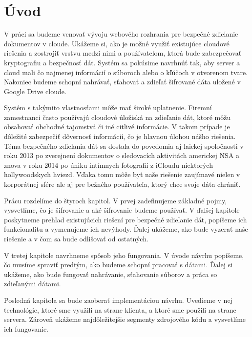 \chapter*{Úvod}

V práci sa budeme venovať vývoju webového rozhrania pre bezpečné zdieľanie dokumentov  v cloude.
Ukážeme si, ako je možné využiť existujúce cloudové riešenia a zostrojiť vrstvu medzi nimi a používateľom, ktorá
bude zabezpečovať kryptografiu a bezpečnosť dát. Systém sa pokúsime navrhnúť tak, aby server a cloud mali čo najmenej 
 informácií o súboroch alebo o kľúčoch v otvorenom tvare.
Nakoniec budeme schopní nahrávať, sťahovať a zdieľať šifrované dáta uložené v Google Drive cloude.

Systém s takýmito vlastnosťami môže mať široké uplatnenie. Firemní zamestnanci často používajú cloudové úložiská na zdieľanie dát, ktoré 
môžu obsahovať obchodné tajomstvá či iné citlivé informácie. V takom prípade je dôležité zabezpečiť dôvernosť informácií, čo je hlavnou úlohou nášho riešenia.
Téma bezpečného zdieľania dát sa dostala do povedomia aj laickej spoločnosti v roku 2013 po zverejnení dokumentov o sledovacích aktivitách americkej NSA a znova v roku 2014 po úniku intímnych fotografií z iCloudu niektorých hollywoodskych hviezd. 
Vďaka tomu môže byť naše riešenie zaujímavé nielen v korporátnej sfére ale aj pre bežného používateľa, ktorý chce svoje dáta chrániť.

Prácu rozdelíme do štyroch kapitol. V prvej zadefinujeme základné pojmy, vysvetlíme, čo je šifrovanie
a aké šifrovanie budeme používať. V ďalšej kapitole
poskytneme prehľad existujúcich riešení pre bezpečné zdieľanie dát, popíšeme ich funkcionalitu a vymenujeme ich nevýhody.
Ďalej ukážeme, ako bude vyzerať naše riešenie a v čom sa bude odlišovať od ostatných.

V tretej kapitole navrhneme spôsob jeho fungovania.  V úvode návrhu popíšeme, čo musíme spraviť predtým, ako budeme schopní pracovať s dátami. 
Ďalej si ukážeme, ako bude fungovať nahrávanie, sťahovanie súborov a práca so zdieľanými dátami.

Posledná kapitola sa bude zaoberať implementáciou návrhu. Uvedieme v nej technológie,
ktoré sme využili na strane klienta, a ktoré sme použili na strane servera. Zároveň ukážeme najdôležitejšie segmenty zdrojového kódu a vysvetlíme ich fungovanie. 

